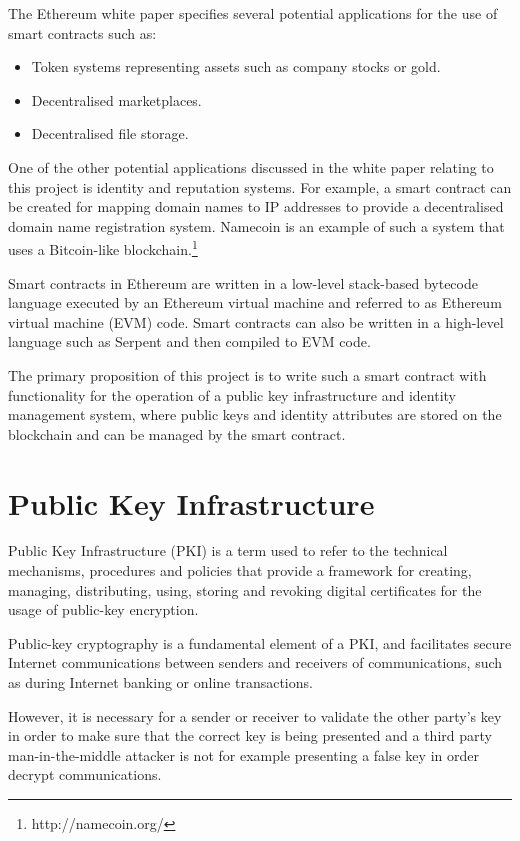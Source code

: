 \documentclass[12pt]{report}
\begin{document}
	The Ethereum white paper specifies several potential applications for the use of smart contracts such as:
	\begin{itemize}
		\item Token systems representing assets such as company stocks or gold.
		\item Decentralised marketplaces.
		\item Decentralised file storage.
	\end{itemize}
	
	One of the other potential applications discussed in the white paper relating to this project is identity and reputation systems. For example, a smart contract can be created for mapping domain names to IP addresses to provide a decentralised domain name registration system. Namecoin is an example of such a system that uses a Bitcoin-like blockchain.\footnote{http://namecoin.org/}
	
	Smart contracts in Ethereum are written in a low-level stack-based bytecode language executed by an Ethereum virtual machine and referred to as Ethereum virtual machine (EVM) code. Smart contracts can also be written in a high-level language such as Serpent and then compiled to EVM code.\cite{3}
	
	The primary proposition of this project is to write such a smart contract with functionality for the operation of a public key infrastructure and identity management system, where public keys and identity attributes are stored on the blockchain and can be managed by the smart contract.
	
	\section{Public Key Infrastructure}
	Public Key Infrastructure (PKI) is a term used to refer to the technical mechanisms, procedures and policies that provide a framework for creating, managing, distributing, using, storing and revoking digital certificates for the usage of public-key encryption.\cite{26}\cite{27}
	
	Public-key cryptography is a fundamental element of a PKI, and facilitates secure Internet communications between senders and receivers of communications, such as during Internet banking or online transactions.
	
	However, it is necessary for a sender or receiver to validate the other party's key in order to make sure that the correct key is being presented and a third party man-in-the-middle attacker is not for example presenting a false key in order decrypt communications.
	
\end{document}
